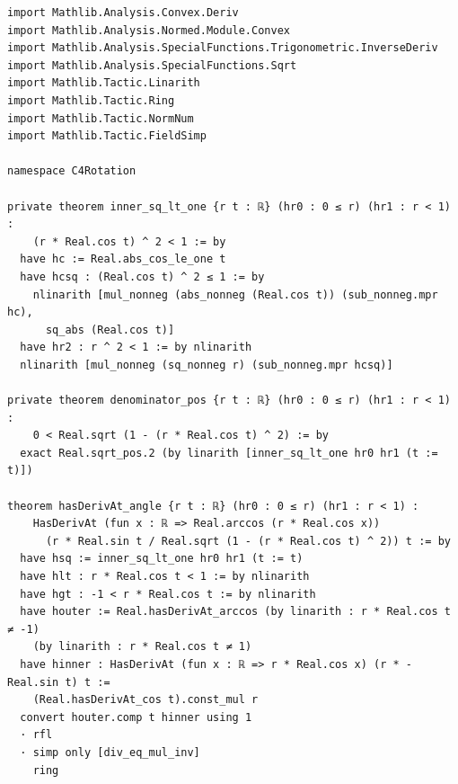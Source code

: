 \documentclass[11pt,a4paper]{article}
\begin{document}
\begin{Verbatim}[breaklines,breakanywhere,fontsize=\footnotesize]
import Mathlib.Analysis.Convex.Deriv
import Mathlib.Analysis.Normed.Module.Convex
import Mathlib.Analysis.SpecialFunctions.Trigonometric.InverseDeriv
import Mathlib.Analysis.SpecialFunctions.Sqrt
import Mathlib.Tactic.Linarith
import Mathlib.Tactic.Ring
import Mathlib.Tactic.NormNum
import Mathlib.Tactic.FieldSimp

namespace C4Rotation

private theorem inner_sq_lt_one {r t : ℝ} (hr0 : 0 ≤ r) (hr1 : r < 1) :
    (r * Real.cos t) ^ 2 < 1 := by
  have hc := Real.abs_cos_le_one t
  have hcsq : (Real.cos t) ^ 2 ≤ 1 := by
    nlinarith [mul_nonneg (abs_nonneg (Real.cos t)) (sub_nonneg.mpr hc),
      sq_abs (Real.cos t)]
  have hr2 : r ^ 2 < 1 := by nlinarith
  nlinarith [mul_nonneg (sq_nonneg r) (sub_nonneg.mpr hcsq)]

private theorem denominator_pos {r t : ℝ} (hr0 : 0 ≤ r) (hr1 : r < 1) :
    0 < Real.sqrt (1 - (r * Real.cos t) ^ 2) := by
  exact Real.sqrt_pos.2 (by linarith [inner_sq_lt_one hr0 hr1 (t := t)])

theorem hasDerivAt_angle {r t : ℝ} (hr0 : 0 ≤ r) (hr1 : r < 1) :
    HasDerivAt (fun x : ℝ => Real.arccos (r * Real.cos x))
      (r * Real.sin t / Real.sqrt (1 - (r * Real.cos t) ^ 2)) t := by
  have hsq := inner_sq_lt_one hr0 hr1 (t := t)
  have hlt : r * Real.cos t < 1 := by nlinarith
  have hgt : -1 < r * Real.cos t := by nlinarith
  have houter := Real.hasDerivAt_arccos (by linarith : r * Real.cos t ≠ -1)
    (by linarith : r * Real.cos t ≠ 1)
  have hinner : HasDerivAt (fun x : ℝ => r * Real.cos x) (r * -Real.sin t) t :=
    (Real.hasDerivAt_cos t).const_mul r
  convert houter.comp t hinner using 1
  · rfl
  · simp only [div_eq_mul_inv]
    ring


\end{Verbatim}
\end{document}
